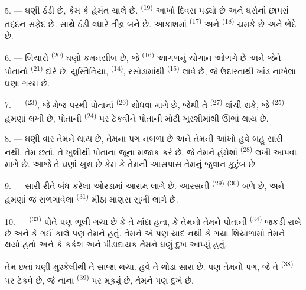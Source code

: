 5. --- ઘણી ઠંડી છે, કેમ કે હેમંત ચાલે છે. 
\textsuperscript{(19)} આખો દિવસ પડ્યો છે અને ઘરોનાં છાપરાં તદ્દન સફેદ
છે.  સાથે ઠંડી વધારે તીવ્ર બને છે. આકાશમાં
 \textsuperscript{(17)} અને 
\textsuperscript{(18)} ચમકે છે અને  ભેદે છે.

\VUsaut{4.2mm}
\VUsaut{3.0mm}

6. --- બિચારો  \textsuperscript{(20)} ઘણો કમનસીબ છે, જે
 \textsuperscript{(16)} આગળનું ચોગાન ઓળંગે છે અને
જેને પોતાનો  \textsuperscript{(21)} દોરે છે. યુસ્તિનિયા,
 \textsuperscript{(14)}, રસોડામાંથી 
\textsuperscript{(15)} લાવે છે, જે ઉદારતાથી ખાંડ નાખેલા ઘણા ગરમ
 છે.

7. ---  \textsuperscript{(23)}, જે મેજ પરથી પોતાનાં
 \textsuperscript{(26)} શોધવા માગે છે, જેથી
તે  \textsuperscript{(27)} વાંચી શકે, જે
 \textsuperscript{(25)} હમણાં લખી છે, પોતાની
 \textsuperscript{(24)} પર ટેકવીને પોતાની મોટી
ખુરશીમાંથી ઊભાં થાય છે.

8. --- ઘણી વાર તેમને 
થાય છે, તેમના પગ નબળા છે અને તેમની આંખો હવે બહુ સારી નથી. તેમ છતાં,
તે ખુશીથી પોતાના જૂના  મજાક કરે છે, જે તેમને હંમેશાં
 \textsuperscript{(28)} લખી આપવા માગે છે. આજે તે ઘણાં ખુશ છે
કેમ કે તેમની આસપાસ તેમનું જુવાન કુટુંબ છે.

9. --- સારી રીતે બંધ કરેલા ઓરડામાં આરામ લાગે છે. આરસની
 \textsuperscript{(29)} 
\textsuperscript{(30)} બળે છે, અને હમણાં જ સળગાવેલા 
\textsuperscript{(31)} મીઠા  માણસ સુખી લાગે છે.

\VUsaut{4.2mm}
\VUsaut{3.0mm}

10. ---  \textsuperscript{(33)} પોતે પણ ભૂલી ગયા છે કે તે
માંદા હતા, કે તેમનો  તેમને પોતાની 
\textsuperscript{(34)} જકડી રાખે છે અને કે ગઈ કાલે પણ તેમને
 હતું. તેમને એ પણ યાદ નથી કે ગયા શિયાળામાં
તેમને  થયો હતો અને કે કર્કશ અને પીડાદાયક
 તેમને ઘણું દુખ આપ્યું હતું.

તેમ છતાં ઘણી મુશ્કેલીથી તે સાજા થયા. હવે તે થોડા સારા છે. પણ તેમનો પગ,
જે તે  \textsuperscript{(38)} પર ટેકવે છે, જે નાના
 \textsuperscript{(39)} પર મૂક્યું છે, તેમને પણ દુખે છે.

